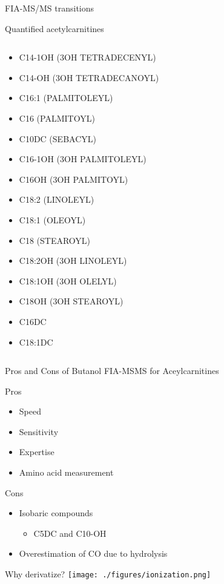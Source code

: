 \documentclass[presentation, smaller]{beamer}
\begin{document}
\begin{frame}[label={sec:orgheadline17}]{FIA-MS/MS transitions}
\begin{block}{Quantified acetylcarnitines}
\begin{columns}
\begin{column}{0.33\columnwidth}
\begin{itemize}
\item C14-1OH (3OH TETRADECENYL)
\item C14-OH (3OH TETRADECANOYL)
\item C16:1 (PALMITOLEYL)
\item C16 (PALMITOYL)
\item C10DC (SEBACYL)
\item C16-1OH (3OH PALMITOLEYL)
\item C16OH (3OH PALMITOYL)
\item C18:2 (LINOLEYL)
\item C18:1 (OLEOYL)
\item C18 (STEAROYL)
\item C18:2OH (3OH LINOLEYL)
\item C18:1OH (3OH OLELYL)
\item C18OH (3OH STEAROYL)
\item C16DC
\item C18:1DC
\end{itemize}
\end{column}
\end{columns}
\end{block}
\end{frame}

\begin{frame}[label={sec:orgheadline18}]{Pros and Cons of Butanol  FIA-MSMS for Aceylcarnitines}
\begin{block}{Pros}
\begin{itemize}
\item Speed
\item Sensitivity
\item Expertise
\item Amino acid measurement
\end{itemize}
\end{block}
\begin{block}{Cons}
\begin{itemize}
\item Isobaric compounds
\begin{itemize}
\item C5DC and C10-OH
\end{itemize}
\item Overestimation of CO due to hydrolysis
\end{itemize}
\end{block}
\end{frame}

\begin{frame}[label={sec:orgheadline19}]{Why derivatize?}
\texttt{[image: ./figures/ionization.png]}
\end{frame}
\end{document}
